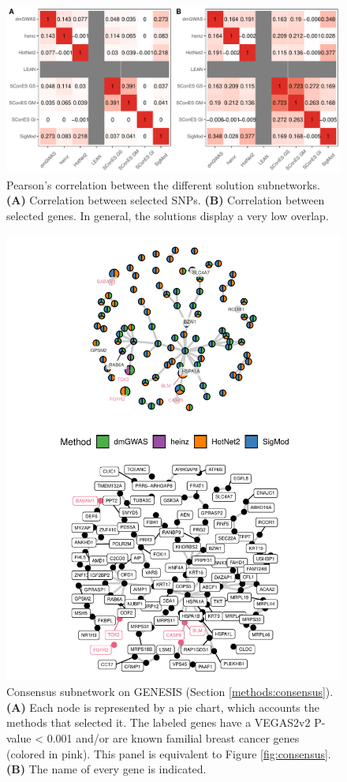 \documentclass[twocolumn, 10pt]{article}
\begin{document}
\begin{figure}[htbp]
\centering
\includegraphics[width=.9\linewidth]{./figures/sfigure_6.pdf}
\caption{\label{sfig:pearson_methods}
Pearson's correlation between the different solution subnetworks. \textbf{(A)} Correlation between selected SNPs. \textbf{(B)} Correlation between selected genes. In general, the solutions display a very low overlap.}
\end{figure}

\begin{figure}[htbp]
\centering
\includegraphics[width=.9\linewidth]{./figures/sfigure_7.pdf}
\caption{\label{sfig:consensus_names}
Consensus subnetwork on GENESIS (Section \ref{methods:consensus}). \textbf{(A)} Each node is represented by a pie chart, which accounts the methods that selected it. The labeled genes have a VEGAS2v2 P-value < 0.001 and/or are known familial breast cancer genes (colored in pink). This panel is equivalent to Figure \ref{fig:consensus}. \textbf{(B)} The name of every gene is indicated.}
\end{figure}
\end{document}
